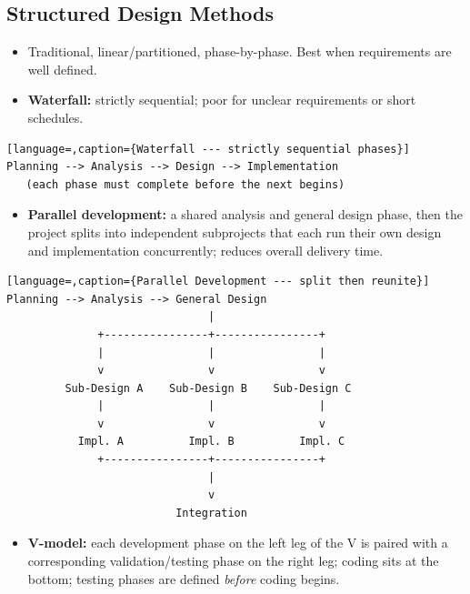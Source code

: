 \documentclass[hidelinks]{article}
\begin{document}
\subsection{Structured Design Methods}
\begin{itemize}
  \item Traditional, linear/partitioned, phase-by-phase. Best when requirements are well defined.
  \item \textbf{Waterfall:} strictly sequential; poor for unclear requirements or short schedules.
\end{itemize}

\begin{lstlisting}[language=,caption={Waterfall --- strictly sequential phases}]
Planning --> Analysis --> Design --> Implementation
   (each phase must complete before the next begins)
\end{lstlisting}

\begin{itemize}
  \item \textbf{Parallel development:} a shared analysis and general design phase, then the project
        splits into independent subprojects that each run their own design and implementation
        concurrently; reduces overall delivery time.
\end{itemize}

\begin{lstlisting}[language=,caption={Parallel Development --- split then reunite}]
Planning --> Analysis --> General Design
                               |
              +----------------+----------------+
              |                |                |
              v                v                v
         Sub-Design A    Sub-Design B    Sub-Design C
              |                |                |
              v                v                v
           Impl. A          Impl. B          Impl. C
              +----------------+----------------+
                               |
                               v
                          Integration
\end{lstlisting}

\begin{itemize}
  \item \textbf{V-model:} each development phase on the left leg of the V is paired with a
        corresponding validation/testing phase on the right leg; coding sits at the bottom; testing
        phases are defined \emph{before} coding begins.
\end{itemize}
\end{document}
